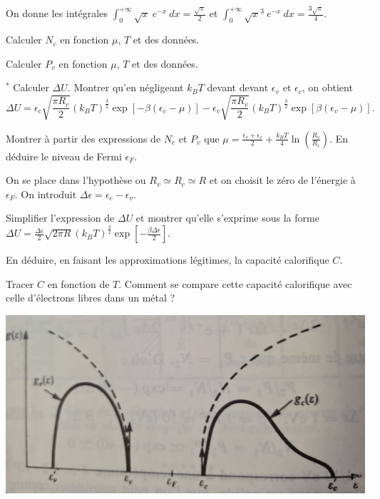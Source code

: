 On donne les intégrales $\int_{0}^{+\infty} \sqrt{x} \ e^{-x} \ dx =\frac{\sqrt{\pi}}{2}$ et  $\int_{0}^{+\infty} \sqrt{x}^3 \ e^{-x} \ dx =\frac{3\sqrt{\pi}}{4}$.


\question Calculer $N_c$ en fonction  $\mu$, $T$ et des données.

\question  Calculer $P_v$ en fonction  $\mu$, $T$ et des données.

\question$^*$ Calculer $\Delta U$.  Montrer qu'en négligeant $k_B T$ devant  devant $\epsilon_v$ et $\epsilon_c$, on obtient
\begin{equation*}
\Delta U=\epsilon_c \sqrt{\frac{\pi R_c}{2}} (k_BT)^{\frac{3}{2}} \exp[-\beta(\epsilon_c-\mu)] - \epsilon_v \sqrt{\frac{\pi R_v}{2}} (k_BT)^{\frac{3}{2}} \exp[\beta(\epsilon_v-\mu)].
\end{equation*}


\question Montrer à partir des expressions de $N_c$ et $P_v$ que $\mu=\frac{\epsilon_v+\epsilon_c}{2}+\frac{k_BT}{4} \ln (\frac{R_v}{R_c})$. En déduire le niveau de Fermi $\epsilon_F$.


On se place dans l'hypothèse ou $R_v \simeq R_c \simeq R$ et on choisit le zéro de l'énergie à $\epsilon_F$. On introduit $\Delta \epsilon=\epsilon_c-\epsilon_v$.

\question Simplifier l'expression de $\Delta U$ et montrer qu'elle s'exprime sous la forme $\Delta U=\frac{\Delta \epsilon}{2} \sqrt{2\pi R}  (k_BT)^{\frac{3}{2}} \exp[-\frac{\beta \Delta \epsilon}{2}]$.

\question En déduire, en faisant les approximations légitimes,  la capacité calorifique $C$.

\question Tracer $C$ en fonction de $T$. Comment se compare cette capacité calorifique avec celle d'électrons libres dans un métal ?
\

\centerline{\includegraphics[height=.32\textwidth]{../Fig/Bandes}}
